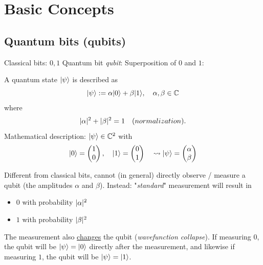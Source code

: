 \section{Basic Concepts}
\subsection{Quantum bits (qubits)}

Classical bits: $0, 1$ \newline
Quantum bit \textit{qubit}: Superposition of $0$ and $1$:

A quantum state $\lvert\psi\rangle$ is described as 
\begin{equation}
    \lvert\psi\rangle := \alpha \lvert0\rangle + \beta \lvert1\rangle, \quad \alpha, \beta \in \mathbb{C} 
\end{equation}
where 
\begin{equation}
    \lvert\alpha\rvert^2 + \lvert\beta\rvert^2 = 1 \quad \text(normalization).
\end{equation}
%
Mathematical description: $\lvert\psi\rangle \in \mathbb{C}^2$ with
\begin{equation*}
    \lvert0\rangle = \begin{pmatrix}1 \\ 0 \end{pmatrix}, 
    \quad \lvert1\rangle = \begin{pmatrix}0 \\ 1\end{pmatrix}
    \quad \leadsto \lvert\psi\rangle = \begin{pmatrix}
        \alpha \\ \beta
    \end{pmatrix}
\end{equation*}


Different from classical bits, cannot (in general) directly observe / measure a qubit 
(the amplitudes $\alpha$ and $\beta$).
%
Instead: "\textit{standard}" measurement will result in 
\begin{itemize}
    \item $0$ with probability $\lvert\alpha\rvert^2$
    \item $1$ with probability $\lvert\beta\rvert^2$
\end{itemize}
%

The measurement also \underline{changes} the qubit (\textit{wavefunction collapse}).
%
If measuring $0$, the qubit will be $\lvert\psi\rangle = \lvert0\rangle$ directly after the measurement,
and likewise if measuring $1$, the qubit will be $\lvert\psi\rangle = \lvert1\rangle$. \newline

